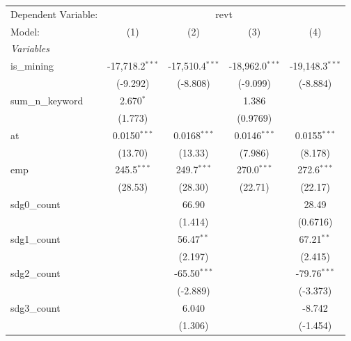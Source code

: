 
\begingroup
\centering
\begin{tabular}{lcccc}
   \tabularnewline \midrule \midrule
   Dependent Variable: & \multicolumn{4}{c}{revt}\\
   Model:            & (1)               & (2)               & (3)               & (4)\\  
   \midrule
   \emph{Variables}\\
   is\_mining        & -17,718.2$^{***}$ & -17,510.4$^{***}$ & -18,962.0$^{***}$ & -19,148.3$^{***}$\\   
                     & (-9.292)          & (-8.808)          & (-9.099)          & (-8.884)\\   
   sum\_n\_keyword   & 2.670$^{*}$       &                   & 1.386             &   \\   
                     & (1.773)           &                   & (0.9769)          &   \\   
   at                & 0.0150$^{***}$    & 0.0168$^{***}$    & 0.0146$^{***}$    & 0.0155$^{***}$\\   
                     & (13.70)           & (13.33)           & (7.986)           & (8.178)\\   
   emp               & 245.5$^{***}$     & 249.7$^{***}$     & 270.0$^{***}$     & 272.6$^{***}$\\   
                     & (28.53)           & (28.30)           & (22.71)           & (22.17)\\   
   sdg0\_count       &                   & 66.90             &                   & 28.49\\   
                     &                   & (1.414)           &                   & (0.6716)\\   
   sdg1\_count       &                   & 56.47$^{**}$      &                   & 67.21$^{**}$\\   
                     &                   & (2.197)           &                   & (2.415)\\   
   sdg2\_count       &                   & -65.50$^{***}$    &                   & -79.76$^{***}$\\   
                     &                   & (-2.889)          &                   & (-3.373)\\   
   sdg3\_count       &                   & 6.040             &                   & -8.742\\   
                     &                   & (1.306)           &                   & (-1.454)\\   

\end{tabular}
